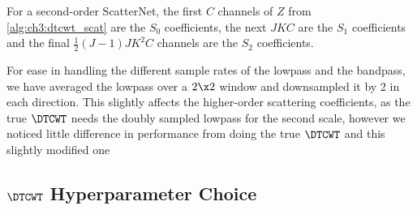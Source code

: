 For a second-order ScatterNet, the first $C$ channels of $Z$ from
\autoref{alg:ch3:dtcwt_scat} are the $S_0$ coefficients, the next $JKC$ are the
$S_1$ coefficients and the final $\frac{1}{2}(J-1)JK^2C$ channels are the
$S_2$ coefficients.

For ease in handling the different sample rates of the lowpass and the
bandpass, we have averaged the lowpass over a $2\x 2$ window and downsampled it
by 2 in each direction. This slightly
affects the higher-order scattering coefficients, as the true $\DTCWT$ needs the doubly
sampled lowpass for the second scale, however we noticed little difference in
performance from doing the true $\DTCWT$ and this slightly modified one

\subsection{$\DTCWT$ Hyperparameter Choice}\label{sec:ch2:dtcwt_hypes}
